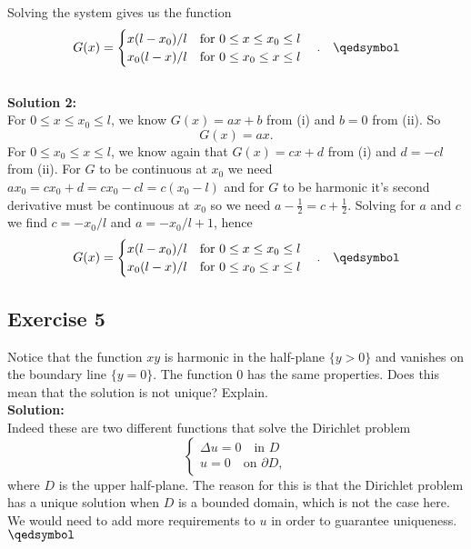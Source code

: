 \documentclass[12pt]{article}%
\begin{document}
Solving the system gives us the function
\[
    G(x) =\begin{cases}
        x(l-x_0)/l \quad \text{for } 0\leq x\leq x_0 \leq l\\
        x_0(l-x)/l \quad \text{for } 0\leq x_0\leq x \leq l
    \end{cases}. \quad \qedsymbol
\]
\\\textbf{Solution 2:}\\
For $0\leq x \leq x_0\leq l$, we know $G(x)=ax+b$ from (i) and $b=0$ from (ii). So
\[
G(x)=ax.
\]
For $0\leq x_0\leq x\leq l$, we know again that $G(x)=cx+d$ from
(i) and $d=-cl$ from (ii). For $G$ to be continuous at $x_0$ we
need $ax_0=cx_0+d=cx_0-cl=c(x_0-l)$ and for $G$ to be harmonic it's second
derivative must be continuous at $x_0$ so we need
$a-\frac{1}{2}=c+\frac{1}{2}$. Solving for $a$ and $c$ we find $c=-x_0/l$ and
$a=-x_0/l+1$, hence
\[
    G(x) =\begin{cases}
        x(l-x_0)/l \quad \text{for } 0\leq x\leq x_0 \leq l\\
        x_0(l-x)/l \quad \text{for } 0\leq x_0\leq x \leq l
    \end{cases}. \quad \qedsymbol
\]
\subsection*{Exercise 5}
Notice that the function $xy$ is harmonic in the half-plane
$\{y>0\}$ and vanishes on the boundary line $\{y=0\}$. The function 0 has the same properties. Does this mean that the solution is not unique? Explain.\\
\textbf{Solution:}\\
Indeed these are two different functions that solve the Dirichlet
problem
\[
    \begin{cases}
    \Delta u =0 \quad \text{in } D\\
    u =0 \quad \text{on } \partial D,
    \end{cases}
\]
where $D$ is the upper half-plane. The reason for this is that the
Dirichlet problem has a unique solution when $D$ is a bounded domain,
which is not the case here. We would need to add more requirements to $u$
in order to guarantee uniqueness. $\qedsymbol$
\end{document}
